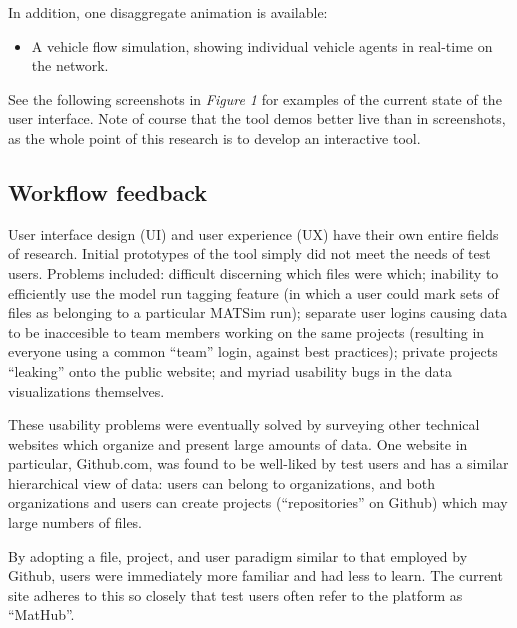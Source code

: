 In addition, one disaggregate animation is available:

\begin{itemize}
\tightlist
\item
  A vehicle flow simulation, showing individual vehicle agents in
  real-time on the network.
\end{itemize}

See the following screenshots in \emph{Figure 1} for examples of the
current state of the user interface. Note of course that the tool demos
better live than in screenshots, as the whole point of this research is
to develop an interactive tool.


\hypertarget{workflow-feedback}{%
\subsection{Workflow feedback}\label{workflow-feedback}}

User interface design (UI) and user experience (UX) have their own
entire fields of research. Initial prototypes of the tool simply did not
meet the needs of test users. Problems included: difficult discerning
which files were which; inability to efficiently use the model run
tagging feature (in which a user could mark sets of files as belonging
to a particular MATSim run); separate user logins causing data to be
inaccesible to team members working on the same projects (resulting in
everyone using a common ``team'' login, against best practices); private
projects ``leaking'' onto the public website; and myriad usability bugs
in the data visualizations themselves.

These usability problems were eventually solved by surveying other
technical websites which organize and present large amounts of data. One
website in particular, Github.com, was found to be well-liked by test
users and has a similar hierarchical view of data: users can belong to
organizations, and both organizations and users can create projects
(``repositories'' on Github) which may large numbers of files.

By adopting a file, project, and user paradigm similar to that employed
by Github, users were immediately more familiar and had less to learn.
The current site adheres to this so closely that test users often refer
to the platform as ``MatHub''.

